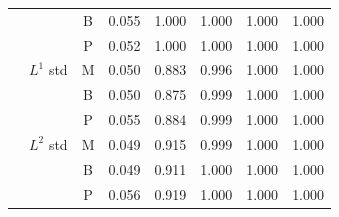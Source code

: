 \begin{tabular*}{\textwidth}{@{\extracolsep\fill}
l
>{\raggedright\arraybackslash}p{3.2cm}
c
*{5}{S[table-format=1.3]}
@{}}
 &  & B & 0.055 & 1.000 & 1.000 & 1.000 & 1.000 \\
 &  & P & 0.052 & 1.000 & 1.000 & 1.000 & 1.000 \\
 & $L^{1}$ std & M & 0.050 & 0.883 & 0.996 & 1.000 & 1.000 \\
 &  & B & 0.050 & 0.875 & 0.999 & 1.000 & 1.000 \\
 &  & P & 0.055 & 0.884 & 0.999 & 1.000 & 1.000 \\
 & $L^{2}$ std & M & 0.049 & 0.915 & 0.999 & 1.000 & 1.000 \\
 &  & B & 0.049 & 0.911 & 1.000 & 1.000 & 1.000 \\
 &  & P & 0.056 & 0.919 & 1.000 & 1.000 & 1.000 \\
\bottomrule
\end{tabular*}
